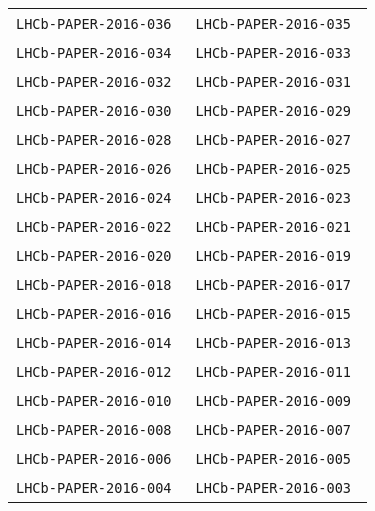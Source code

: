 \begin{center}
\begin{longtable}{ll}
\texttt{LHCb-PAPER-2016-036}~\cite{LHCb-PAPER-2016-036} & 
\texttt{LHCb-PAPER-2016-035}~\cite{LHCb-PAPER-2016-035} \\
\texttt{LHCb-PAPER-2016-034}~\cite{LHCb-PAPER-2016-034} & 
\texttt{LHCb-PAPER-2016-033}~\cite{LHCb-PAPER-2016-033} \\
\texttt{LHCb-PAPER-2016-032}~\cite{LHCb-PAPER-2016-032} & 
\texttt{LHCb-PAPER-2016-031}~\cite{LHCb-PAPER-2016-031} \\
\texttt{LHCb-PAPER-2016-030}~\cite{LHCb-PAPER-2016-030} & 
\texttt{LHCb-PAPER-2016-029}~\cite{LHCb-PAPER-2016-029} \\
\texttt{LHCb-PAPER-2016-028}~\cite{LHCb-PAPER-2016-028} & 
\texttt{LHCb-PAPER-2016-027}~\cite{LHCb-PAPER-2016-027} \\
\texttt{LHCb-PAPER-2016-026}~\cite{LHCb-PAPER-2016-026} &
\texttt{LHCb-PAPER-2016-025}~\cite{LHCb-PAPER-2016-025} \\
\texttt{LHCb-PAPER-2016-024}~\cite{LHCb-PAPER-2016-024} &
\texttt{LHCb-PAPER-2016-023}~\cite{LHCb-PAPER-2016-023} \\
\texttt{LHCb-PAPER-2016-022}~\cite{LHCb-PAPER-2016-022} &
\texttt{LHCb-PAPER-2016-021}~\cite{LHCb-PAPER-2016-021} \\
\texttt{LHCb-PAPER-2016-020}~\cite{LHCb-PAPER-2016-020} &
\texttt{LHCb-PAPER-2016-019}~\cite{LHCb-PAPER-2016-019} \\
\texttt{LHCb-PAPER-2016-018}~\cite{LHCb-PAPER-2016-018} &
\texttt{LHCb-PAPER-2016-017}~\cite{LHCb-PAPER-2016-017} \\
\texttt{LHCb-PAPER-2016-016}~\cite{LHCb-PAPER-2016-016} &
\texttt{LHCb-PAPER-2016-015}~\cite{LHCb-PAPER-2016-015} \\
\texttt{LHCb-PAPER-2016-014}~\cite{LHCb-PAPER-2016-014} &
\texttt{LHCb-PAPER-2016-013}~\cite{LHCb-PAPER-2016-013} \\
\texttt{LHCb-PAPER-2016-012}~\cite{LHCb-PAPER-2016-012} &
\texttt{LHCb-PAPER-2016-011}~\cite{LHCb-PAPER-2016-011} \\
\texttt{LHCb-PAPER-2016-010}~\cite{LHCb-PAPER-2016-010} &
\texttt{LHCb-PAPER-2016-009}~\cite{LHCb-PAPER-2016-009} \\
\texttt{LHCb-PAPER-2016-008}~\cite{LHCb-PAPER-2016-008} &
\texttt{LHCb-PAPER-2016-007}~\cite{LHCb-PAPER-2016-007} \\
\texttt{LHCb-PAPER-2016-006}~\cite{LHCb-PAPER-2016-006} &
\texttt{LHCb-PAPER-2016-005}~\cite{LHCb-PAPER-2016-005} \\
\texttt{LHCb-PAPER-2016-004}~\cite{LHCb-PAPER-2016-004} &
\texttt{LHCb-PAPER-2016-003}~\cite{LHCb-PAPER-2016-003} \\

\end{longtable}
\end{center}
